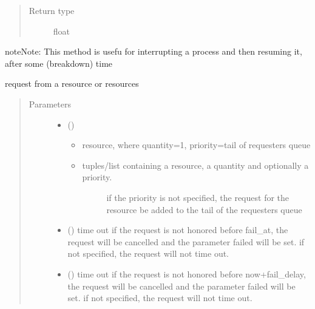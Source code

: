 \documentclass[letterpaper,10pt,english]{sphinxmanual}
\begin{document}
\begin{fulllineitems}
\begin{fulllineitems}
\begin{quote}
\begin{description}
\item[{Return type}] \leavevmode
float

\end{description}\end{quote}

\begin{sphinxadmonition}{note}{Note:}
This method is usefu for interrupting a process and then resuming it,
after some (breakdown) time
\end{sphinxadmonition}

\end{fulllineitems}


\begin{fulllineitems}
\label{\detokenize{Reference:salabim.Component.request}}
request from a resource or resources
\begin{quote}\begin{description}
\item[{Parameters}] \leavevmode\begin{itemize}
\item {} 
 () \textendash{} \begin{itemize}
\item {} 
resource, where quantity=1, priority=tail of requesters queue

\item {} \begin{description}
\item[{tuples/list containing a resource, a quantity and optionally a priority.}] \leavevmode
if the priority is not specified, the request
for the resource be added to the tail of
the requesters queue 

\end{description}

\end{itemize}


\item {} 
 () \textendash{} time out 
if the request is not honored before fail\_at,
the request will be cancelled and the
parameter failed will be set. 
if not specified, the request will not time out.

\item {} 
 () \textendash{} time out 
if the request is not honored before now+fail\_delay,
the request will be cancelled and the
parameter failed will be set. 
if not specified, the request will not time out.


\end{itemize}
\end{description}
\end{quote}
\end{fulllineitems}
\end{fulllineitems}
\end{document}

